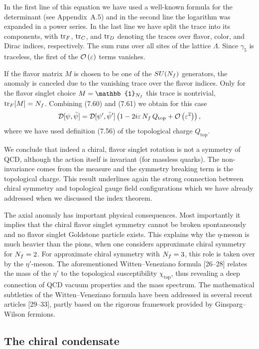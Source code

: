 In the first line of this equation we have used a well-known formula for the
determinant (see Appendix~A.5) and in the second line the logarithm was
expanded in a power series. In the last line we have split the trace into its
components, with $\operatorname{tr}_F$, $\operatorname{tr}_C$, and $\operatorname{tr}_D$ denoting the traces over flavor,
color, and Dirac indices, respectively. The sum runs over all sites of the
lattice $\Lambda$. Since $\gamma_5$ is traceless, the first of the
$\mathcal{O}\left(\varepsilon\right)$ terms vanishes.

If the flavor matrix $M$ is chosen to be one of the $SU(N_f)$ generators, the
anomaly is canceled due to the vanishing trace over the flavor indices. Only
for the flavor singlet choice $M = \mathbb{1}_{\Nf}$ this trace is nontrivial,
$\operatorname{tr}_F[M] = N_f$. Combining (7.60) and (7.61) we obtain for this case
\begin{equation}
  \mathcal{D}[\psi,\bar\psi]
  = \mathcal{D}[\psi',\bar\psi']\left(1 - 2i\varepsilon\,N_f\,Q_{\mathrm{top}}
     + \mathcal{O}\left(\varepsilon^2\right)\right),
\end{equation}
where we have used definition (7.56) of the topological charge
$Q_{\mathrm{top}}$.

We conclude that indeed a chiral, flavor singlet rotation is not a symmetry of
QCD, although the action itself is invariant (for massless quarks). The
non-invariance comes from the measure and the symmetry breaking term is the
topological charge. This result underlines again the strong connection between
chiral symmetry and topological gauge field configurations which we have
already addressed when we discussed the index theorem.

The axial anomaly has important physical consequences. Most importantly it
implies that the chiral flavor singlet symmetry cannot be broken spontaneously
and no flavor singlet Goldstone particle exists. This explains why the
$\eta$-meson is much heavier than the pions, when one considers approximate
chiral symmetry for $N_f = 2$. For approximate chiral symmetry with $N_f = 3$,
this role is taken over by the $\eta'$-meson. The aforementioned
Witten--Veneziano formula [26--28] relates the mass of the $\eta'$ to the
topological susceptibility $\chi_{\mathrm{top}}$, thus revealing a deep
connection of QCD vacuum properties and the mass spectrum. The mathematical
subtleties of the Witten--Veneziano formula have been addressed in several
recent articles [29--33], partly based on the rigorous framework provided by
Ginsparg--Wilson fermions.

\subsection{The chiral condensate}

